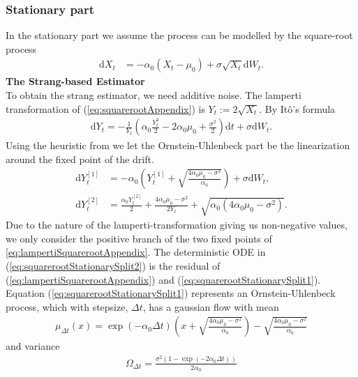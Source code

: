 \subsubsection{Stationary part}\label{subsubsec:squarerootStationary}
In the stationary part we assume the process can be modelled by the square-root process
\begin{align}
    \mathrm{d}X_t &= -\alpha_0\left(X_t - \mu_0\right) + \sigma \sqrt{X_t} \mathrm{d}W_t. \label{eq:squarerootAppendix}
\end{align}
\textbf{The Strang-based Estimator}\\
To obtain the strang estimator, we need additive noise. The lamperti transformation of (\ref{eq:squarerootAppendix}) is $Y_t := 2\sqrt{X_t}$. By Itô's formula
\begin{align}
    \mathrm{d}Y_t = - \frac{1}{Y_t}\left(\alpha_0 \frac{Y_t^2}{2} - 2 \alpha_0 \mu_0 + \frac{\sigma^2}{2}\right)\mathrm{d}t + \sigma \mathrm{d}W_t. \label{eq:lampertiSquarerootAppendix}
\end{align}
Using the heuristic from \cite[section 2.3 and 2.5]{SplittingSchemes} we let the Ornstein-Uhlenbeck part be the linearization around the fixed point of the drift.
\begin{align}
    \mathrm{d}Y_t^{[1]} &= -\alpha_0 \left(Y_t^{[1]} + \sqrt{\frac{4\alpha_0 \mu_0 - \sigma^2}{\alpha_0}}\right) + \sigma \mathrm{d}W_t , \label{eq:squarerootStationarySplit1} \\
    \mathrm{d}Y_t^{[2]} &= \frac{\alpha_0 Y_t^{[2]}}{2} + \frac{4\alpha_0 \mu_0 - \sigma^2}{2 Y_t} + \sqrt{\alpha_0\left(4\alpha_0\mu_0 - \sigma^2\right)}. \label{eq:squarerootStationarySplit2}
\end{align}
Due to the nature of the lamperti-transformation giving us non-negative values, we only consider the positive branch of the two fixed points of \ref{eq:lampertiSquarerootAppendix}. The deterministic ODE in (\ref{eq:squarerootStationarySplit2}) is the residual of (\ref{eq:lampertiSquarerootAppendix}) and (\ref{eq:squarerootStationarySplit1}).
Equation (\ref{eq:squarerootStationarySplit1}) represents an Ornstein-Uhlenbeck process, which with stepsize, $\Delta t$, has a gaussian flow with mean 
\begin{align}
    \mu_{\Delta t}(x) = \exp\left(-\alpha_0 \Delta t\right) \left(x + \sqrt{\frac{4\alpha_0\mu_0 - \sigma^2}{\alpha_0}}\right) - \sqrt{\frac{4\alpha_0\mu_0 - \sigma^2}{\alpha_0}}
\end{align}
and variance
\begin{align}
     \Omega_{\Delta t} = \frac{\sigma^2\left(1 - \exp\left(-2\alpha_0 \Delta t\right)\right)}{2\alpha_0}
\end{align}
